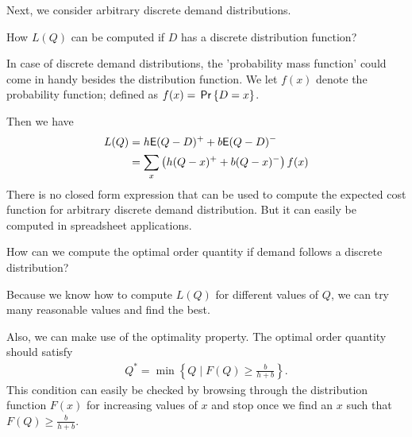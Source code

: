 %
%
%
%

Next, we consider arbitrary discrete demand distributions. 

\begin{question}
How $L(Q)$ can be computed if $D$ has a discrete distribution function?
\end{question}

\begin{solution}
In case of discrete demand distributions, the 'probability mass function' could come in handy besides the distribution function. We let $f(x)$ denote the probability function; defined as $f(x)=\,\mathsf{Pr}\left\{D=x\right\}$. 

Then we have
\begin{align*}
L(Q) & = h \mathsf{E} (Q-D)^+ + b \mathsf{E} (Q-D)^- \\
	 & = \sum_x \left(h (Q-x)^+ + b (Q-x)^-\right) f(x)
\end{align*}
There is no closed form expression that can be used to compute the expected cost function for arbitrary discrete demand distribution. But it can easily be computed in spreadsheet applications. 
\end{solution}

\begin{question}
How can we compute the optimal order quantity if demand follows a discrete distribution?
\end{question}

\begin{solution}
Because we know how to compute $L(Q)$ for different values of $Q$, we can try many reasonable values and find the best. 

Also, we can make use of the optimality property. The optimal order quantity should satisfy 
\begin{align*}
Q^* = \min\left\{Q\mid F(Q)\geq \frac{b}{h+b}\right\}.
\end{align*}
This condition can easily be checked by browsing through the distribution function $F(x)$ for increasing values of $x$ and stop once we find an $x$ such that $F(Q)\geq \frac{b}{h+b}$.
\end{solution}
